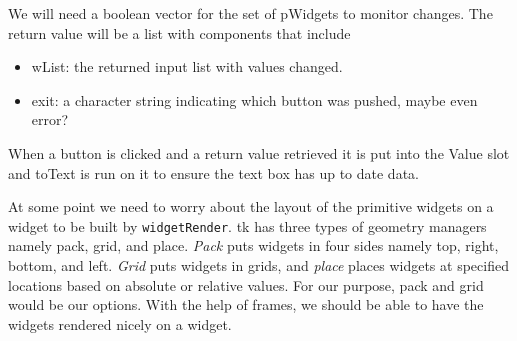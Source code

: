 \documentclass{article}
\begin{document}

We will need a boolean vector for the set of pWidgets to monitor
changes. The return value will be a list with components that include
\begin{itemize}
\item wList: the returned input list with values changed.
\item exit: a character string indicating which button was pushed,
  maybe even error?
\end{itemize}

When a button is clicked and a return value retrieved it is put into
the Value slot and toText is run on it to ensure the text box has up
to date data.

At some point we need to worry about the layout of the primitive
widgets on a widget to be built by \verb+widgetRender+. tk has three
types of geometry managers namely pack, grid, and place. {\em Pack} puts
widgets in four sides namely top, right, bottom, and left. {\em Grid} puts
widgets in grids, and {\em place} places widgets at specified locations
based on absolute or relative values. For our purpose, pack and grid
would be our options. With the help of frames, we should be able to
have the widgets rendered nicely on a widget.

\end{document}
